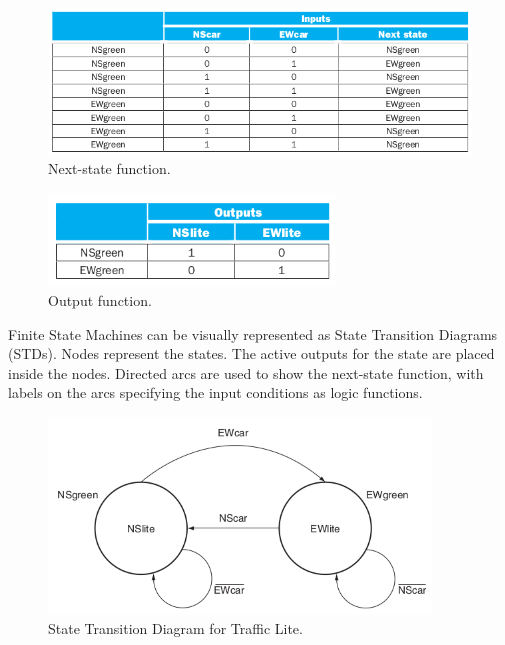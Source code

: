 \documentclass[a4paper, 11pt,oneside]{article}
\begin{document}
\begin{figure}[H]
	\begin{center}
	\includegraphics[width=4.5in]{fsm1.png}
	\caption{Next-state function.}
	\label{fig:fsm1} 
	\end{center}
\end{figure}

\begin{figure}[H]
	\begin{center}
	\includegraphics[width=3in]{fsm2.png}
	\caption{Output function.}
	\label{fig:fsm2} 
	\end{center}
\end{figure}

Finite State Machines can be visually represented as State Transition Diagrams 
(STDs). Nodes represent the states. The active outputs for the state are placed
inside the nodes. Directed arcs are used to show the next-state function, with 
labels on the arcs specifying the input conditions as logic functions.

\begin{figure}[H]
	\begin{center}
	\includegraphics[width=4in]{fsm3.png}
	\caption{State Transition Diagram for Traffic Lite.}
	\label{fig:mux} 
	\end{center}
\end{figure}
\end{document}
